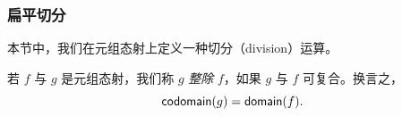  

\subsubsection{扁平切分}
\label{subsubsection.flatdivision}

本节中，我们在元组态射上定义一种切分（division）运算。 

\begin{definition}
    若 $f$ 与 $g$ 是元组态射，我们称 $g$ {\it 整除} $f$，如果 $g$ 与 $f$ 可复合。换言之，
    \[
    \mathsf{codomain}(g) = \mathsf{domain}(f).
    \]
\end{definition}





